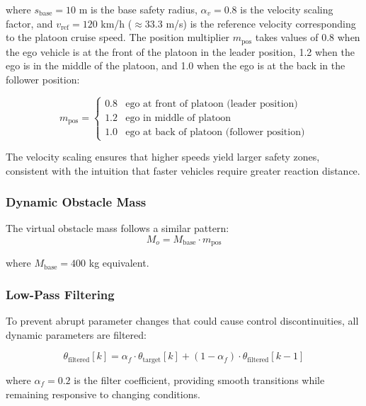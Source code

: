 \documentclass[12pt,a4paper,oneside]{report}
\begin{document}
where $s_{\text{base}} = 10$ m is the base safety radius, $\alpha_v = 0.8$ is the velocity scaling factor, and $v_{\text{ref}} = 120$ km/h ($\approx 33.3$ m/s) is the reference velocity corresponding to the platoon cruise speed. The position multiplier $m_{\text{pos}}$ takes values of 0.8 when the ego vehicle is at the front of the platoon in the leader position, 1.2 when the ego is in the middle of the platoon, and 1.0 when the ego is at the back in the follower position:

\begin{equation}
m_{\text{pos}} = \begin{cases}
0.8 & \text{ego at front of platoon (leader position)} \\
1.2 & \text{ego in middle of platoon} \\
1.0 & \text{ego at back of platoon (follower position)}
\end{cases}
\label{eq:position_multiplier}
\end{equation}

The velocity scaling ensures that higher speeds yield larger safety zones, consistent with the intuition that faster vehicles require greater reaction distance.

\subsubsection{Dynamic Obstacle Mass}

The virtual obstacle mass follows a similar pattern:
\begin{equation}
M_o = M_{\text{base}} \cdot m_{\text{pos}}
\label{eq:dynamic_mass}
\end{equation}

where $M_{\text{base}} = 400$ kg equivalent.

\subsubsection{Low-Pass Filtering}

To prevent abrupt parameter changes that could cause control discontinuities, all dynamic parameters are filtered:

\begin{equation}
\theta_{\text{filtered}}[k] = \alpha_f \cdot \theta_{\text{target}}[k] + (1 - \alpha_f) \cdot \theta_{\text{filtered}}[k-1]
\label{eq:lowpass_filter}
\end{equation}

where $\alpha_f = 0.2$ is the filter coefficient, providing smooth transitions while remaining responsive to changing conditions.
\end{document}
